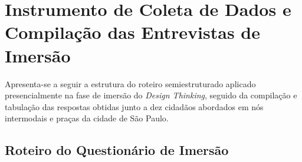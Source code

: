 \section{Instrumento de Coleta de Dados e Compilação das Entrevistas de Imersão}
\label{apendice:questionario}

Apresenta-se a seguir a estrutura do roteiro semiestruturado aplicado presencialmente na fase de imersão do \emph{Design Thinking}, seguido da compilação e tabulação das respostas obtidas junto a dez cidadãos abordados em nós intermodais e praças da cidade de São Paulo.

\subsection{Roteiro do Questionário de Imersão}
